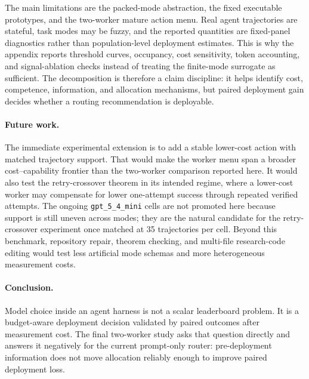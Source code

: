\documentclass{article}
\begin{document}
The main limitations are the packed-mode abstraction, the fixed executable prototypes, and the two-worker mature action menu.
Real agent trajectories are stateful, task modes may be fuzzy, and the reported quantities are fixed-panel diagnostics rather than population-level deployment estimates.
This is why the appendix reports threshold curves, occupancy, cost sensitivity, token accounting, and signal-ablation checks instead of treating the finite-mode surrogate as sufficient.
The decomposition is therefore a claim discipline: it helps identify cost, competence, information, and allocation mechanisms, but paired deployment gain decides whether a routing recommendation is deployable.

\paragraph{Future work.}
The immediate experimental extension is to add a stable lower-cost action with matched trajectory support.
That would make the worker menu span a broader cost--capability frontier than the two-worker comparison reported here.
It would also test the retry-crossover theorem in its intended regime, where a lower-cost worker may compensate for lower one-attempt success through repeated verified attempts.
The ongoing \texttt{gpt\_5\_4\_mini} cells are not promoted here because support is still uneven across modes; they are the natural candidate for the retry-crossover experiment once matched at 35 trajectories per cell.
Beyond this benchmark, repository repair, theorem checking, and multi-file research-code editing would test less artificial mode schemas and more heterogeneous measurement costs.

\paragraph{Conclusion.}
Model choice inside an agent harness is not a scalar leaderboard problem.
It is a budget-aware deployment decision validated by paired outcomes after measurement cost.
The final two-worker study asks that question directly and answers it negatively for the current prompt-only router: pre-deployment information does not move allocation reliably enough to improve paired deployment loss.




\appendix


\end{document}
